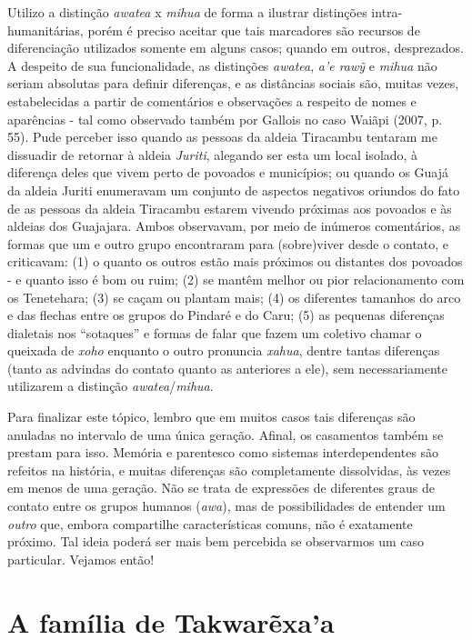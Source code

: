 Utilizo a distinção \emph{awatea} x \emph{mihua} de forma a ilustrar
distinções intra-humanitárias, porém é preciso aceitar que tais
marcadores são recursos de diferenciação utilizados somente em alguns
casos; quando em outros, desprezados. A despeito de sua funcionalidade,
as distinções \emph{awatea}, \emph{a'e rawỹ} e \emph{mihua} não seriam
absolutas para definir diferenças, e as distâncias sociais são, muitas
vezes, estabelecidas a partir de comentários e observações a respeito de
nomes e aparências - tal como observado também por Gallois no caso
Waiãpi (2007, p. 55). Pude perceber isso quando as pessoas da aldeia
Tiracambu tentaram me dissuadir de retornar à aldeia \emph{Juriti},
alegando ser esta um local isolado, à diferença deles que vivem perto de
povoados e municípios; ou quando os Guajá da aldeia Juriti enumeravam um
conjunto de aspectos negativos oriundos do fato de as pessoas da aldeia
Tiracambu estarem vivendo próximas aos povoados e às aldeias dos
Guajajara. Ambos observavam, por meio de inúmeros comentários, as formas
que um e outro grupo encontraram para (sobre)viver desde o contato, e
criticavam: (1) o quanto os outros estão mais próximos ou distantes dos
povoados - e quanto isso é bom ou ruim; (2) se mantêm melhor ou pior
relacionamento com os Tenetehara; (3) se caçam ou plantam mais; (4) os
diferentes tamanhos do arco e das flechas entre os grupos do Pindaré e
do Caru; (5) as pequenas diferenças dialetais nos ``sotaques'' e formas
de falar que fazem um coletivo chamar o queixada de \emph{xoho} enquanto
o outro pronuncia \emph{xahua}, dentre tantas diferenças (tanto as
advindas do contato quanto as anteriores a ele), sem necessariamente
utilizarem a distinção \emph{awatea}/\emph{mihua}.

Para finalizar este tópico, lembro que em muitos casos tais diferenças
são anuladas no intervalo de uma única geração. Afinal, os casamentos
também se prestam para isso. Memória e parentesco como sistemas
interdependentes são refeitos na história, e muitas diferenças são
completamente dissolvidas, às vezes em menos de uma geração. Não se
trata de expressões de diferentes graus de contato entre os grupos
humanos (\emph{awa}), mas de possibilidades de entender um \emph{outro}
que, embora compartilhe características comuns, não é exatamente
próximo. Tal ideia poderá ser mais bem percebida se observarmos um caso
particular. Vejamos então!

\section{A família de Takwarẽxa'a}\label{a-famuxedlia-de-takwarexaa}

